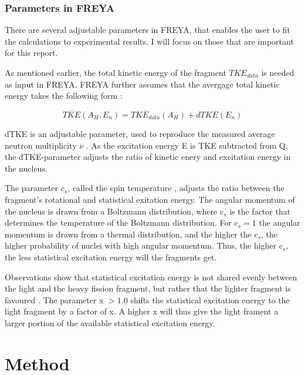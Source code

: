 \documentclass[]{article}
\begin{document}
\subsubsection{Parameters in FREYA}
\label{Parameters_FREYA}
There are several adjustable parameters in FREYA, that enables the user to fit the calculations to experimental results. I will focus on those that are important for this report. 

As mentioned earlier, the total kinetic energy of the fragment $TKE_{data}$ is needed as input in FREYA. FREYA further assumes that the avergage total kinetic energy takes the following form \cite{FREYAusemanual}:

\begin{equation}
	\label{eq:total_kinetiv_energy}
	\overline{TKE}(A_H, E_n) = \overline{TKE_{data}}(A_H) + dTKE(E_n)
\end{equation}

dTKE is an adjustable parameter, used to reproduce the measured average neutron multiplicity $\nu$ \cite{FREYAusemanual}. As the excitation energy E is TKE subtracted from Q, the dTKE-parameter adjusts the ratio of kinetic enery and excitation energy in the nucleus. \par 
\vspace{3mm}

The parameter c$_s$, called the spin temperature \cite{FREYAusemanual}, adjusts the ratio between the fragment's rotational and statistical exitation energy. The angular momentum of the nucleus is drawn from a Boltzmann distribution, where c$_s$ is the factor that determines the temperature of the Boltzmann distribution. For c$_s = 1$ the angular momentum is drawn from a thermal distribution, and the higher the c$_s$, the higher probability of nuclei with high angular momentum. Thus, the higher c$_s$, the less statistical excitation energy will the fragments get. \par 

\vspace{3mm}

Observations show that statistical excitation energy is not shared evenly between the light and the heavy fission fragment, but rather that the lighter fragment is favoured \cite{FREYAusemanual}. The parameter x $>1.0$ shifts the statistical excitation energy to the light fragment by a factor of x. A higher x will thus give the light frament a larger portion of the available statistical excitation energy.

\section{Method}
\end{document}
